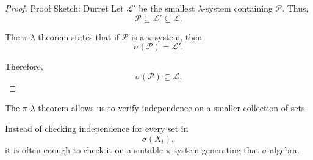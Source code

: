 \begin{proof}
Proof Sketch: Durret
Let $\mathcal{L}'$ be the smallest $\lambda$-system containing
$\mathcal{P}$. Thus,
\[
    \mathcal{P}
    \subseteq
    \mathcal{L}'
    \subseteq
    \mathcal{L}.
\]

The $\pi$-$\lambda$ theorem states that if $\mathcal{P}$ is a
$\pi$-system, then
\[
    \sigma(\mathcal{P})
    =
    \mathcal{L}'.
\]

Therefore,
\[
    \sigma(\mathcal{P})
    \subseteq
    \mathcal{L}.
\]

\end{proof}


\begin{remark}

The $\pi$-$\lambda$ theorem allows us to verify independence on a
smaller collection of sets.

Instead of checking independence for every set in
\[
    \sigma(X_i),
\]
it is often enough to check it on a suitable $\pi$-system generating
that $\sigma$-algebra.

\end{remark}


\lectureend
